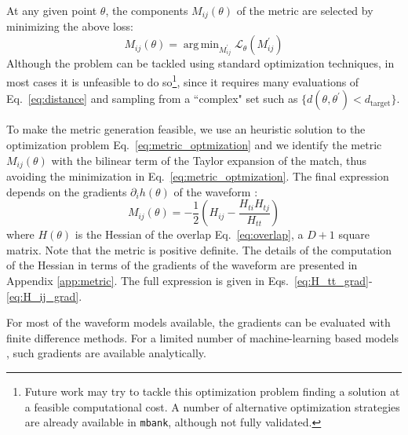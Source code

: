 \documentclass[twocolumn,showpacs,preprintnumbers,nofootinbib,prd,
superscriptaddress,10pt]{revtex4-2}
\DeclareMathOperator*{\argmin}{arg\,min}
\begin{document}
At any given point $\theta$, the components $M_{ij}(\theta)$ of the metric are selected by minimizing the above loss:
\begin{equation} \label{eq:metric_optmization}
	M_{ij}(\theta) = \argmin_{M^\prime_{ij}}  \mathcal{L}_\theta(M^\prime_{ij})
\end{equation}
Although the problem can be tackled using standard optimization techniques, in most cases it is unfeasible to do so\footnote{
Future work may try to tackle this optimization problem finding a solution at a feasible computational cost. A number of alternative optimization strategies are already available in \texttt{mbank}, although not fully validated.},
since it requires many evaluations of Eq.~\eqref{eq:distance} and sampling from a ``complex" set such as $\{d(\theta,\theta^\prime) < d_\mathrm{target}\}$.

To make the metric generation feasible, we use an heuristic solution to the optimization problem Eq.~\eqref{eq:metric_optmization} and we identify the metric $M_{ij}(\theta)$ with the bilinear term of the Taylor expansion of the match, thus avoiding the minimization in Eq.~\eqref{eq:metric_optmization}.
The final expression depends on the gradients $\partial_i h(\theta)$ of the waveform \cite{owen_metric}:
\begin{equation}\label{eq:metric_expression}
	M_{ij}(\theta) = - \frac{1}{2} \left( H_{ij} - \frac{H_{ti}H_{tj}}{H_{tt}} \right)
\end{equation}
where $H(\theta)$ is the Hessian of the overlap Eq.~\eqref{eq:overlap}, a $D+1$ square matrix.
Note that the metric is positive definite. The details of the computation of the Hessian in terms of the gradients of the waveform are presented in Appendix \ref{app:metric}. The full expression is given in Eqs.~\eqref{eq:H_tt_grad}-\eqref{eq:H_ij_grad}.

For most of the waveform models available, the gradients can be evaluated with finite difference methods. For a limited number of machine-learning based models \cite{Khan:2020fso, PhysRevD.103.043020, ML_wf_model, Tissino:2022thn}, such gradients are available analytically.
\end{document}
